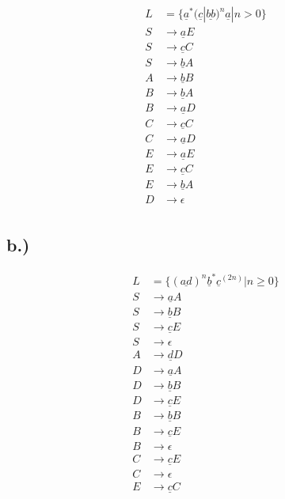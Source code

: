\documentclass[12pt,runningheads,a4paper]{llncs}
\begin{document}
\begin{align*}
L &= \{\underline{a}^* (\underline{c} |\underline{bb})^n \underline{a} | n>0	\}	\\
S &\rightarrow \underline{a}E  \\
S &\rightarrow \underline{c}C  \\
S &\rightarrow \underline{b}A  \\
A &\rightarrow \underline{b}B  \\
B &\rightarrow \underline{b}A  \\
B &\rightarrow \underline{a}D  \\
C &\rightarrow \underline{c}C  \\
C &\rightarrow \underline{a}D  \\
E &\rightarrow \underline{a}E  \\
E &\rightarrow \underline{c}C  \\
E &\rightarrow \underline{b}A  \\
D &\rightarrow \epsilon  \\
\end{align*}

\subsection*{b.)}

\begin{align*}
L &= \{(\underline{ad})^n \underline{b}^* \underline{c}^{(2n)} | n \geq 0    \}	\\
S &\rightarrow \underline{a}A \\
S &\rightarrow \underline{b}B \\
S &\rightarrow \underline{c}E \\
S &\rightarrow \epsilon \\
A &\rightarrow \underline{d}D \\
D &\rightarrow \underline{a}A \\
D &\rightarrow \underline{b}B \\
D &\rightarrow \underline{c}E \\
B &\rightarrow \underline{b}B \\
B &\rightarrow \underline{c}E \\
B &\rightarrow \epsilon \\
C &\rightarrow \underline{c}E \\
C &\rightarrow \epsilon \\
E &\rightarrow \underline{c}C \\
\end{align*}
\end{document}
